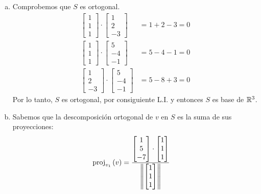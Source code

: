 \begin{solution}
	\begin{enumerate}[a)]
		\item Comprobemos que $S$ es ortogonal.
		\begin{align*}
			\begin{bmatrix}
				1 \\ 1 \\ 1
			\end{bmatrix}
			\cdot
			\begin{bmatrix}
				1 \\ 2 \\ -3
			\end{bmatrix}
			&= 1 + 2 - 3 = 0\\
			\begin{bmatrix}
				1 \\ 1 \\ 1
			\end{bmatrix}
			\cdot
			\begin{bmatrix}
				5 \\ -4 \\ -1
			\end{bmatrix}
			&= 5 - 4 - 1 = 0\\
			\begin{bmatrix}
				1 \\ 2 \\ -3
			\end{bmatrix}
			\cdot
			\begin{bmatrix}
				5 \\ -4 \\ -1
			\end{bmatrix}
			&= 5 - 8 + 3 = 0
		\end{align*}
		Por lo tanto, $S$ es ortogonal, por consiguiente L.I. y entonces $S$ es base de $\rmath[3]$.
		\item Sabemos que la descomposición ortogonal de $v$ en $S$ es la suma de sus proyecciones:
		\begin{align*}
			\mproj{v}{v_{1}} &=\dfrac{
				\begin{bmatrix}
					1 \\ 5 \\ -7
				\end{bmatrix}
				\cdot
				\begin{bmatrix}
					1 \\ 1 \\ 1
				\end{bmatrix}
			}{\norm{
				\begin{bmatrix}
					1 \\ 1 \\ 1

\end{bmatrix}}}
\end{align*}
\end{enumerate}
\end{solution}
